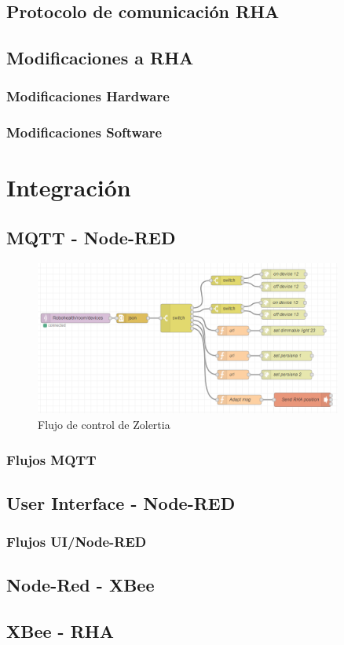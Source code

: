 \subsection{Protocolo de comunicación RHA}

\subsection{Modificaciones a RHA}

\subsubsection{Modificaciones Hardware}

\subsubsection{Modificaciones Software}


\section{Integración}

\subsection{MQTT - Node-RED}

\begin{figure}[tb]
\centering
\includegraphics[width=0.9\textwidth]{figuras/MQTTFlow.png}
\caption{Flujo de control de Zolertia}
\label{fig:MQTTFlow}
\end{figure}

\subsubsection{Flujos MQTT}

\subsection{User Interface - Node-RED}

\subsubsection{Flujos UI/Node-RED}

\subsection{Node-Red - XBee}

\subsection{XBee - RHA}
